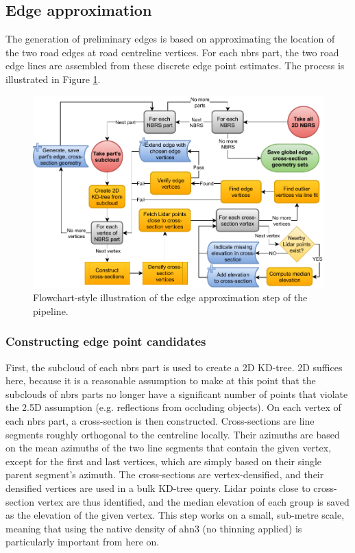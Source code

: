 \subsection{Edge approximation}
\label{sub:m_edgeapproximation}

The generation of preliminary edges is based on approximating the location of the two road edges at road centreline vertices. For each \ac{nbrs} part, the two road edge lines are assembled from these discrete edge point estimates. The process is illustrated in Figure \ref{fig:edgeapproximationflow}.

\begin{figure}
    \centering
    \includegraphics[width=\linewidth]{final_report/figs/edge_estimation.pdf}
    \caption{Flowchart-style illustration of the edge approximation step of the pipeline.}
    \label{fig:edgeapproximationflow}
\end{figure}

\subsubsection{Constructing edge point candidates}

First, the subcloud of each \ac{nbrs} part is used to create a 2D KD-tree. 2D suffices here, because it is a reasonable assumption to make at this point that the subclouds of \ac{nbrs} parts no longer have a significant number of points that violate the 2.5D assumption (e.g. reflections from occluding objects). On each vertex of each \ac{nbrs} part, a cross-section is then constructed. Cross-sections are line segments roughly orthogonal to the centreline locally. Their azimuths are based on the mean azimuths of the two line segments that contain the given vertex, except for the first and last vertices, which are simply based on their single parent segment's azimuth. The cross-sections are vertex-densified, and their densified vertices are used in a bulk KD-tree query. Lidar points close to cross-section vertex are thus identified, and the median elevation of each group is saved as the elevation of the given vertex. This step works on a small, sub-metre scale, meaning that using the native density of \ac{ahn3} (no thinning applied) is particularly important from here on.

